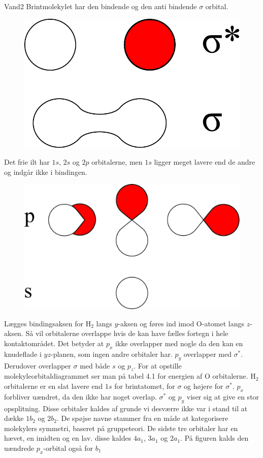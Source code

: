 \begin{opgave}{Vand}{2}
\opg Brintmolekylet har den bindende og den anti bindende $\sigma$ orbital.
\begin{figure}[h]
\center
\includegraphics[width = \textwidth]{Atom-ogMolekylefysik/billeder/tilstande1.pdf}
\end{figure}
\opg
Det frie ilt har $1s$, $2s$ og $2p$ orbitalerne, men $1s$ ligger meget lavere end de andre og indgår ikke i bindingen.
\begin{figure}[h]
\center
\includegraphics[width = \textwidth]{Atom-ogMolekylefysik/billeder/tilstande2.pdf}
\end{figure}
\opg
Lægges bindingsaksen for H$_2$ langs $y$-aksen og føres ind imod O-atomet langs $z$-aksen. Så vil orbitalerne overlappe hvis de kan have fælles fortegn i hele kontaktområdet. Det betyder at $p_x$ ikke overlapper med nogle da den kan en knudeflade i $yz$-planen, som ingen andre orbitaler har. $p_y$ overlapper med $\sigma^*$. Derudover overlapper $\sigma$ med både $s$ og $p_z$.
\opg For at opstille molekyleorbitaldiagrammet ser man på tabel 4.1 for energien af O orbitalerne. H$_2$ orbitalerne er en slat lavere end $1s$ for brintatomet, for $\sigma$ og højere for $\sigma^*$.
$p_x$ forbliver uændret, da den ikke har noget overlap. 
$\sigma^*$ og $p_y$ viser sig at give en stor opsplitning. Disse orbitaler kaldes af grunde vi desværre ikke var i stand til at dække $1b_2$ og $2b_2$. De spøjse navne stammer fra en måde at kategorisere molekylers symmetri, baseret på gruppeteori.
De sidste tre orbitaler har en hævet, en imidten og en lav. disse kaldes $4a_1$, $3a_1$ og $2a_1$. På figuren kalds den uændrede $p_x$-orbital også for $b_1$


\end{opgave}
